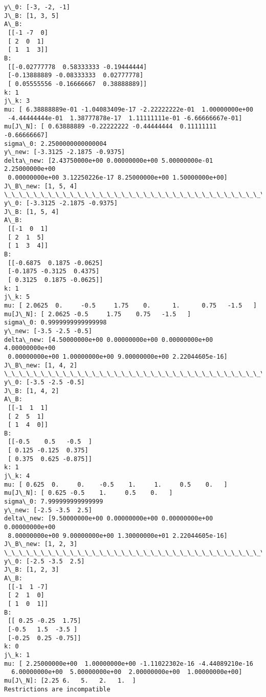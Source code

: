 \documentclass[11pt]{article}
\begin{document}
    \begin{Verbatim}[commandchars=\\\{\}]
y\_0: [-3, -2, -1]
J\_B: [1, 3, 5]
A\_B: 
 [[-1 -7  0]
 [ 2  0  1]
 [ 1  1  3]]
B: 
 [[-0.02777778  0.58333333 -0.19444444]
 [-0.13888889 -0.08333333  0.02777778]
 [ 0.05555556 -0.16666667  0.38888889]]
k: 1
j\_k: 3
mu: [ 6.38888889e-01 -1.04083409e-17 -2.22222222e-01  1.00000000e+00
 -4.44444444e-01  1.38777878e-17  1.11111111e-01 -6.66666667e-01]
mu[J\_N]: [ 0.63888889 -0.22222222 -0.44444444  0.11111111 -0.66666667]
sigma\_0: 2.2500000000000004
y\_new: [-3.3125 -2.1875 -0.9375]
delta\_new: [2.43750000e+00 0.00000000e+00 5.00000000e-01 2.25000000e+00
 0.00000000e+00 3.12250226e-17 8.25000000e+00 1.50000000e+00]
J\_B\_new: [1, 5, 4]
\_\_\_\_\_\_\_\_\_\_\_\_\_\_\_\_\_\_\_\_\_\_\_\_\_\_\_\_\_\_\_\_\_\_\_\_\_\_\_\_\_\_\_\_\_\_\_\_\_\_\_\_\_\_\_\_\_\_\_\_\_\_\_\_\_\_\_\_\_\_\_\_\_\_\_\_\_\_\_\_\_\_\_\_\_\_\_\_\_\_\_\_\_\_\_\_\_\_\_\_
y\_0: [-3.3125 -2.1875 -0.9375]
J\_B: [1, 5, 4]
A\_B: 
 [[-1  0  1]
 [ 2  1  5]
 [ 1  3  4]]
B: 
 [[-0.6875  0.1875 -0.0625]
 [-0.1875 -0.3125  0.4375]
 [ 0.3125  0.1875 -0.0625]]
k: 1
j\_k: 5
mu: [ 2.0625  0.     -0.5     1.75    0.      1.      0.75   -1.5   ]
mu[J\_N]: [ 2.0625 -0.5     1.75    0.75   -1.5   ]
sigma\_0: 0.9999999999999998
y\_new: [-3.5 -2.5 -0.5]
delta\_new: [4.50000000e+00 0.00000000e+00 0.00000000e+00 4.00000000e+00
 0.00000000e+00 1.00000000e+00 9.00000000e+00 2.22044605e-16]
J\_B\_new: [1, 4, 2]
\_\_\_\_\_\_\_\_\_\_\_\_\_\_\_\_\_\_\_\_\_\_\_\_\_\_\_\_\_\_\_\_\_\_\_\_\_\_\_\_\_\_\_\_\_\_\_\_\_\_\_\_\_\_\_\_\_\_\_\_\_\_\_\_\_\_\_\_\_\_\_\_\_\_\_\_\_\_\_\_\_\_\_\_\_\_\_\_\_\_\_\_\_\_\_\_\_\_\_\_
y\_0: [-3.5 -2.5 -0.5]
J\_B: [1, 4, 2]
A\_B: 
 [[-1  1  1]
 [ 2  5  1]
 [ 1  4  0]]
B: 
 [[-0.5    0.5   -0.5  ]
 [ 0.125 -0.125  0.375]
 [ 0.375  0.625 -0.875]]
k: 1
j\_k: 4
mu: [ 0.625  0.     0.    -0.5    1.     1.     0.5    0.   ]
mu[J\_N]: [ 0.625 -0.5    1.     0.5    0.   ]
sigma\_0: 7.999999999999999
y\_new: [-2.5 -3.5  2.5]
delta\_new: [9.50000000e+00 0.00000000e+00 0.00000000e+00 0.00000000e+00
 8.00000000e+00 9.00000000e+00 1.30000000e+01 2.22044605e-16]
J\_B\_new: [1, 2, 3]
\_\_\_\_\_\_\_\_\_\_\_\_\_\_\_\_\_\_\_\_\_\_\_\_\_\_\_\_\_\_\_\_\_\_\_\_\_\_\_\_\_\_\_\_\_\_\_\_\_\_\_\_\_\_\_\_\_\_\_\_\_\_\_\_\_\_\_\_\_\_\_\_\_\_\_\_\_\_\_\_\_\_\_\_\_\_\_\_\_\_\_\_\_\_\_\_\_\_\_\_
y\_0: [-2.5 -3.5  2.5]
J\_B: [1, 2, 3]
A\_B: 
 [[-1  1 -7]
 [ 2  1  0]
 [ 1  0  1]]
B: 
 [[ 0.25 -0.25  1.75]
 [-0.5   1.5  -3.5 ]
 [-0.25  0.25 -0.75]]
k: 0
j\_k: 1
mu: [ 2.25000000e+00  1.00000000e+00 -1.11022302e-16 -4.44089210e-16
  6.00000000e+00  5.00000000e+00  2.00000000e+00  1.00000000e+00]
mu[J\_N]: [2.25 6.   5.   2.   1.  ]
Restrictions are incompatible

    \end{Verbatim}
\end{document}
